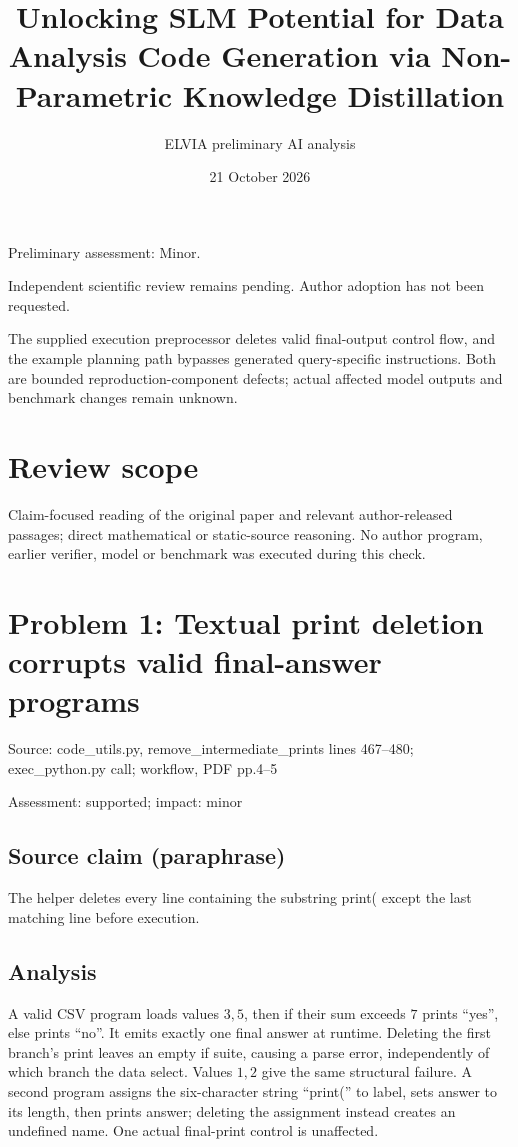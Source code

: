 \documentclass[11pt]{article}
\begin{document}
\title{Unlocking SLM Potential for Data Analysis Code Generation via Non-Parametric Knowledge Distillation}

\author{ELVIA preliminary AI analysis}\date{21 October 2026}\maketitle

Preliminary assessment: Minor.\par

Independent scientific review remains pending. Author adoption has not been requested.

The supplied execution preprocessor deletes valid final-output control flow, and the example planning path bypasses generated query-specific instructions. Both are bounded reproduction-component defects; actual affected model outputs and benchmark changes remain unknown.

\section*{Review scope}

Claim-focused reading of the original paper and relevant author-released passages; direct mathematical or static-source reasoning. No author program, earlier verifier, model or benchmark was executed during this check.

\section*{Problem 1: Textual print deletion corrupts valid final-answer programs}

Source: code\_utils.py, remove\_intermediate\_prints lines 467–480; exec\_python.py call; workflow, PDF pp.4–5

Assessment: supported; impact: minor

\subsection*{Source claim (paraphrase)}

The helper deletes every line containing the substring print( except the last matching line before execution.

\subsection*{Analysis}

A valid CSV program loads values \(3,5\), then if their sum exceeds \(7\) prints “yes”, else prints “no”. It emits exactly one final answer at runtime. Deleting the first branch’s print leaves an empty if suite, causing a parse error, independently of which branch the data select. Values \(1,2\) give the same structural failure. A second program assigns the six-character string “print(” to label, sets answer to its length, then prints answer; deleting the assignment instead creates an undefined name. One actual final-print control is unaffected.
\end{document}
